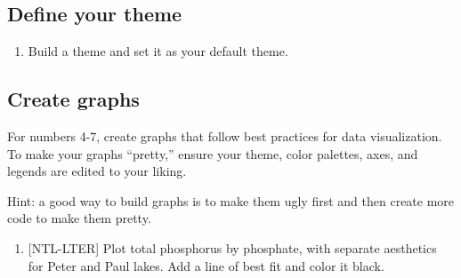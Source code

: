 \documentclass[]{article}
\newenvironment{Shaded}{\begin{snugshade}}{\end{snugshade}}
\newcommand{\KeywordTok}[1]{\textcolor[rgb]{0.13,0.29,0.53}{\textbf{#1}}}
\newcommand{\DataTypeTok}[1]{\textcolor[rgb]{0.13,0.29,0.53}{#1}}
\newcommand{\DecValTok}[1]{\textcolor[rgb]{0.00,0.00,0.81}{#1}}
\newcommand{\StringTok}[1]{\textcolor[rgb]{0.31,0.60,0.02}{#1}}
\newcommand{\CommentTok}[1]{\textcolor[rgb]{0.56,0.35,0.01}{\textit{#1}}}
\newcommand{\OperatorTok}[1]{\textcolor[rgb]{0.81,0.36,0.00}{\textbf{#1}}}
\newcommand{\NormalTok}[1]{#1}
\providecommand{\tightlist}{%
  \setlength{\itemsep}{0pt}\setlength{\parskip}{0pt}}
\begin{document}
\subsection{Define your theme}\label{define-your-theme}

\begin{enumerate}
\def\labelenumi{\arabic{enumi}.}
\setcounter{enumi}{2}
\tightlist
\item
  Build a theme and set it as your default theme.
\end{enumerate}

\begin{Shaded}
\end{Shaded}

\subsection{Create graphs}\label{create-graphs}

For numbers 4-7, create graphs that follow best practices for data
visualization. To make your graphs ``pretty,'' ensure your theme, color
palettes, axes, and legends are edited to your liking.

Hint: a good way to build graphs is to make them ugly first and then
create more code to make them pretty.

\begin{enumerate}
\def\labelenumi{\arabic{enumi}.}
\setcounter{enumi}{3}
\tightlist
\item
  {[}NTL-LTER{]} Plot total phosphorus by phosphate, with separate
  aesthetics for Peter and Paul lakes. Add a line of best fit and color
  it black.
\end{enumerate}
\end{document}
